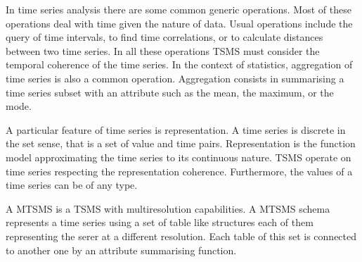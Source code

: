 In time series analysis there are some common generic operations.
Most of these operations deal with time given the nature of data.
Usual operations include the query of time intervals, to find time
correlations, or to calculate distances between two time series. In
all these operations TSMS must consider the temporal coherence of the
time series.  In the context of statistics, aggregation of time series
is also a common operation. Aggregation consists in summarising a time
series subset with an attribute such as the mean, the maximum, or the
mode.

A particular feature of time series is representation. A time series
is discrete in the set sense, that is a set of value and time
pairs. Representation is the function model approximating the time
series to its continuous nature. TSMS operate on time series
respecting the representation coherence. Furthermore, the values of a
time series can be of any type.

A MTSMS is a TSMS with multiresolution capabilities.  A MTSMS schema
represents a time series using a set of table like structures each of
them representing the serer at a different resolution.  Each table of
this set is connected to another one by an attribute summarising
function.



%   


%   


